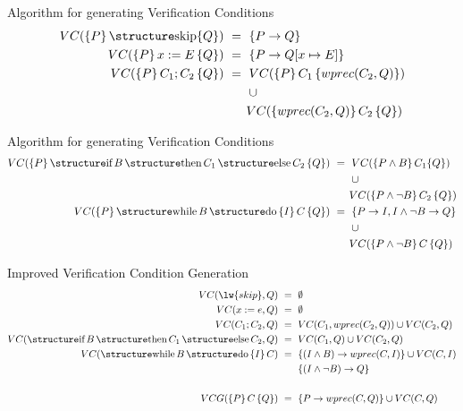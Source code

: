 \documentclass[aspectratio=169]{beamer}
\begin{document}
\begin{slide}{Algorithm for generating Verification Conditions}
 \begin{align*}
 VC(\{P\}\,\kw{skip}\{Q\}) & ~=~ \{P \to Q\} \\
 VC(\{P\}\,x := E\,\{Q\})  & ~=~ \{P \to Q[x \mapsto E]\} \\
 VC(\{P\}\,C_1;C_2\,\{Q\}) & ~=~ VC(\{P\}\,C_1\,\{wprec(C_2,Q)\}) \\ &\:\:\:\:\:\:\:\:\:\cup \\& \:\:\:\:\:\:\:\:VC(\{wprec(C_2,Q)\}\,C_2\,\{Q\})  
 \end{align*}

\end{slide}

\begin{slide}{Algorithm for generating Verification Conditions}
 \begin{align*}
 VC(\{P\}\,\kw{if}\,B\,\kw{then}\,C_1\,\kw{else}\,C_2\,\{Q\}) & ~=~ VC(\{P \land B\}\,C_1\{Q\}) \\ &\:\:\:\:\:\:\:\:\:\cup \\& \:\:\:\:\:\:\:\:VC(\{P \land \neg B\}\,C_2\,\{Q\}) \\
 VC(\{P\}\,\kw{while}\,B\,\kw{do}\,\{I\}\,C\,\{Q\}) & ~=~ \{ P \to I , I \land \neg B \to Q\} \\ &\:\:\:\:\:\:\:\:\:\cup \\& \:\:\:\:\:\:\:\: VC(\{P \land \neg B\}\,C\,\{Q\}) 
 \end{align*}

\end{slide}

\begin{slide}{Improved Verification Condition Generation}
\begin{align*}
VC(\lw{skip},Q) & ~=~ \emptyset\\
VC(x := e,Q)    & ~=~ \emptyset\\
VC(C_1;C_2,Q)   & ~=~ VC(C_1,wprec(C_2,Q)) \cup VC(C_2,Q)\\
VC(\kw{if}\,B\,\kw{then}\,C_1\,\kw{else}\,C_2,Q) & ~=~ VC(C_1,Q) \cup VC(C_2,Q)\\
VC(\kw{while}\,B\,\kw{do}\,\{I\}\,C) & ~=~ \{ (I \land B) \to wprec(C,I) \} \cup VC(C,I)\\
& \:\:\:\:\:\:\:\:\:\{(I \land \neg B) \to Q\}\\
& \\
VCG(\{P\}\,C\,\{Q\}) & ~=~ \{P \to wprec(C,Q)\} \cup VC(C,Q)
\end{align*}
\end{slide}
\end{document}
